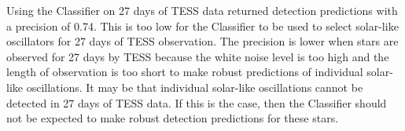 \documentclass[a4paper,fleqn,usenatbib,useAMS]{mnras}
\newcommand{\kep}{\ensuremath{Kepler}\:}
\begin{document}
Using the Classifier on 27 days of TESS data returned detection predictions with a precision of 0.74. This is too low for the Classifier to be used to select solar-like oscillators for 27 days of TESS observation. The precision is lower when stars are observed for 27 days by TESS because the white noise level is too high and the length of observation is too short to make robust predictions of individual solar-like oscillations. It may be that individual solar-like oscillations cannot be detected in 27 days of TESS data. If this is the case, then the Classifier should not be expected to make robust detection predictions for these stars.











\bsp
\label{lastpage}
\end{document}
